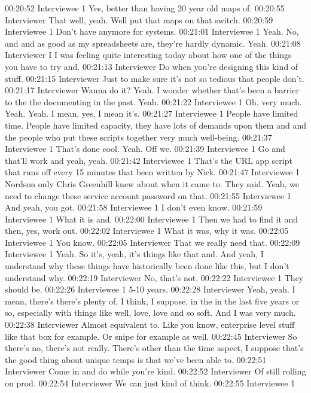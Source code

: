 00:20:52 Interviewee 1
Yes, better than having 20 year old maps of.
00:20:55 Interviewer
That well, yeah. Well put that maps on that switch.
00:20:59 Interviewee 1
Don't have anymore for systems.
00:21:01 Interviewee 1
Yeah. No, and and as good as my spreadsheets are, they're hardly dynamic. Yeah.
00:21:08 Interviewer
I I was feeling quite interesting today about how one of the things you have to try and.
00:21:13 Interviewer
Do when you're designing this kind of stuff.
00:21:15 Interviewer
Just to make sure it's not so tedious that people don't.
00:21:17 Interviewer
Wanna do it? Yeah. I wonder whether that's been a barrier to the the documenting in the past. Yeah.
00:21:22 Interviewee 1
Oh, very much. Yeah. Yeah. I mean, yes, I mean it's.
00:21:27 Interviewee 1
People have limited time. People have limited capacity, they have lots of demands upon them and and the people who put these scripts together very much well-being.
00:21:37 Interviewee 1
That's done cool. Yeah. Off we.
00:21:39 Interviewee 1
Go and that'll work and yeah, yeah.
00:21:42 Interviewee 1
That's the URL app script that runs off every 15 minutes that been written by Nick.
00:21:47 Interviewee 1
Nordson only Chris Greenhill knew about when it came to. They said. Yeah, we need to change these service account password on that.
00:21:55 Interviewee 1
And yeah, you got.
00:21:58 Interviewee 1
I don't even know.
00:21:59 Interviewee 1
What it is and.
00:22:00 Interviewee 1
Then we had to find it and then, yes, work out.
00:22:02 Interviewee 1
What it was, why it was.
00:22:05 Interviewee 1
You know.
00:22:05 Interviewer
That we really need that.
00:22:09 Interviewee 1
Yeah. So it's, yeah, it's things like that and. And yeah, I understand why these things have historically been done like this, but I don't understand why.
00:22:19 Interviewer
No, that's not.
00:22:22 Interviewee 1
They should be.
00:22:26 Interviewee 1
5-10 years.
00:22:28 Interviewer
Yeah, yeah. I mean, there's there's plenty of, I think, I suppose, in the in the last five years or so, especially with things like well, love, love and so soft. And I was very much.
00:22:38 Interviewer
Almost equivalent to. Like you know, enterprise level stuff like that box for example. Or snipe for example as well.
00:22:45 Interviewer
So there's no, there's not really. There's other than the time aspect, I suppose that's the good thing about unique temps is that we've been able to.
00:22:51 Interviewer
Come in and do while you're kind.
00:22:52 Interviewer
Of still rolling on prod.
00:22:54 Interviewer
We can just kind of think.
00:22:55 Interviewee 1
